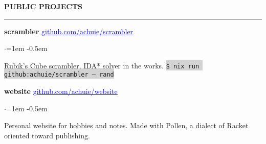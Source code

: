 \documentclass[10pt, a4paper]{article}
\newenvironment{aSection}[1]{
    \medskip \textbf{\uppercase{#1}}
    \smallskip
    \hrule
    \begin{list}{}{
            \setlength{\leftmargin}{1.5em}
        }
    \item[]
    }{
    \end{list}
}
\newenvironment{projSubsection}[2]{
    {#1} \hfill {#2}
    \smallskip
    \begin{list}{$\cdot$}{\leftmargin=1em}
    \itemsep -0.5em \vspace{-0.5em}
    }{
    \end{list}
    \vspace{0.5em}
}
\begin{document}
\begin{aSection}{Public Projects}
    \begin{projSubsection}
        {\textbf{scrambler}}
        {\href{https://www.github.com/achuie/scrambler}{\textcolor{blue}{\underline{github.com/achuie/scrambler}}}}
    \item[] Rubik's Cube scrambler, IDA* solver in the works.
        \colorbox{lightgray}{\texttt{\$ nix run github:achuie/scrambler -- rand}}
    \end{projSubsection}

    \begin{projSubsection}
        {\textbf{website}}
        {\href{https://www.github.com/achuie/website}{\textcolor{blue}{\underline{github.com/achuie/website}}}}
    \item[] Personal website for hobbies and notes. Made with Pollen, a dialect of Racket oriented toward publishing.
    \end{projSubsection}
\end{aSection}
\end{document}
